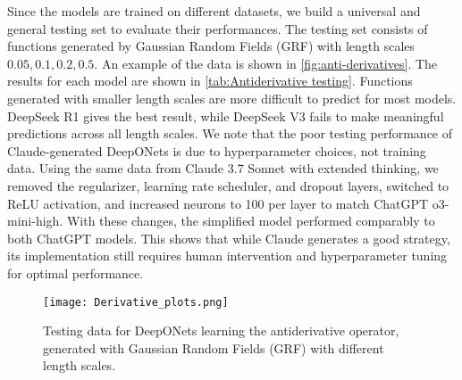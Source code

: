 \documentclass{article}
\begin{document}
Since the models are trained on different datasets, we build a universal and general testing set to evaluate their performances. The testing set consists of functions generated by Gaussian Random Fields (GRF) with length scales  $0.05, 0.1, 0.2, 0.5$. An example of the data is shown in \autoref{fig:anti-derivatives}. The results for each model are shown in \autoref{tab:Antiderivative testing}. Functions generated with smaller length scales are more difficult to predict for most models. DeepSeek R1 gives the best result, while DeepSeek V3 fails to make meaningful predictions across all length scales. We note that the poor testing performance of Claude-generated DeepONets is due to hyperparameter choices, not training data. Using the same data from Claude 3.7 Sonnet with extended thinking, we removed the regularizer, learning rate scheduler, and dropout layers, switched to ReLU activation, and increased neurons to 100 per layer to match ChatGPT o3-mini-high. With these changes, the simplified model performed comparably to both ChatGPT models. This shows that while Claude generates a good strategy, its implementation still requires human intervention and hyperparameter tuning for optimal performance.

\begin{figure}[h!]
    \centering
    \texttt{[image: Derivative\_plots.png]}
    \caption{Testing data for DeepONets learning the antiderivative operator, generated with Gaussian Random Fields (GRF) with different length scales.}
    \label{fig:anti-derivatives}
\end{figure}
\end{document}
